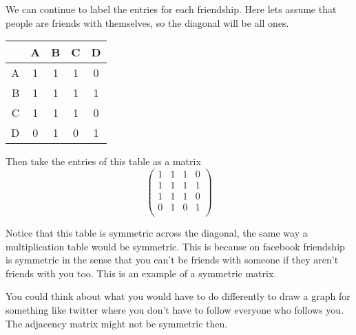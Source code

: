 {We can continue to label the entries for each friendship. Here lets assume that people are friends with themselves, so the diagonal will be all ones.

\begin{center}
\begin{tabular}{r | c c c c}
 & A & B& C & D \\
 \hline
 A &1 &1 &1 &0  \\
 B &1 &1 &1 &1  \\
 C &1 &1 &1 &0  \\
 D &0 &1 &0 &1  \\
\end{tabular}
\end{center}

Then take the entries of this table as a matrix
\[
\left(
\begin{array}{cccc}
1 &1 &1 &0  \\
1 &1 &1 &1  \\
1 &1 &1 &0  \\
0 &1 &0 &1  \\
\end{array} \right)
\]

Notice that this table is symmetric across the diagonal, the same way a multiplication table would be symmetric. This is because on facebook friendship is symmetric in the sense that you can't be friends with someone if they aren't friends with you too. This is an example of a symmetric matrix. 

You could think about what you would have to do differently to draw a graph for something like twitter where you don't have to follow everyone who follows you. The adjacency matrix might not be symmetric then. 


} %

